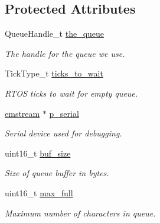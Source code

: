 \subsection*{Protected Attributes}
\begin{DoxyCompactItemize}
\item 
\mbox{\label{class_text_queue_a7697f86be6c148f866c97f9ab09fec6f}} 
Queue\+Handle\+\_\+t \mbox{\hyperlink{class_text_queue_a7697f86be6c148f866c97f9ab09fec6f}{the\+\_\+queue}}
\begin{DoxyCompactList}\small\item\em The handle for the queue we use. \end{DoxyCompactList}\item 
\mbox{\label{class_text_queue_a9649f4aa53b284bacd1a9a965b4b4253}} 
Tick\+Type\+\_\+t \mbox{\hyperlink{class_text_queue_a9649f4aa53b284bacd1a9a965b4b4253}{ticks\+\_\+to\+\_\+wait}}
\begin{DoxyCompactList}\small\item\em R\+T\+OS ticks to wait for empty queue. \end{DoxyCompactList}\item 
\mbox{\label{class_text_queue_a0d411a9febed573dbb696fd839800e6e}} 
\mbox{\hyperlink{classemstream}{emstream}} $\ast$ \mbox{\hyperlink{class_text_queue_a0d411a9febed573dbb696fd839800e6e}{p\+\_\+serial}}
\begin{DoxyCompactList}\small\item\em Serial device used for debugging. \end{DoxyCompactList}\item 
\mbox{\label{class_text_queue_a008676818bd8590067bbee01ab15aa8d}} 
uint16\+\_\+t \mbox{\hyperlink{class_text_queue_a008676818bd8590067bbee01ab15aa8d}{buf\+\_\+size}}
\begin{DoxyCompactList}\small\item\em Size of queue buffer in bytes. \end{DoxyCompactList}\item 
\mbox{\label{class_text_queue_aca22e9161be54b4f2232d0c8884c4001}} 
uint16\+\_\+t \mbox{\hyperlink{class_text_queue_aca22e9161be54b4f2232d0c8884c4001}{max\+\_\+full}}
\begin{DoxyCompactList}\small\item\em Maximum number of characters in queue. \end{DoxyCompactList}\end{DoxyCompactItemize}
